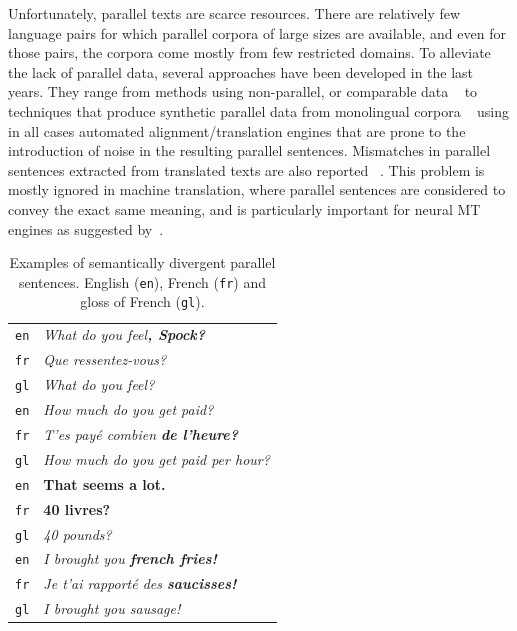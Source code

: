 \documentclass[11pt,a4paper]{article}
\begin{document}
Unfortunately, parallel texts are scarce resources. 
There are relatively few language pairs for which parallel corpora of large sizes are available, and even for those pairs, the corpora come mostly from few restricted domains. 
To alleviate the lack of parallel data, several approaches have been developed in the last years. 
They range from methods using non-parallel, or comparable data 
~\cite{Zhao:2002:APS:844380.844785,W04-3208,J05-4003,GregoireL18,P17-3003,P18-2037} to techniques that produce synthetic parallel data from monolingual corpora ~\cite{P16-1009,W17-4714} using in all cases automated alignment/translation engines that are prone to the introduction of noise in the resulting parallel sentences. 
Mismatches in parallel sentences extracted from translated texts are also reported ~\cite{tiedemann2011bitext,XU16.310}. 
This problem is mostly ignored in machine translation, where parallel sentences are considered to convey the exact same meaning, and is particularly important for neural MT engines as suggested by~\cite{chen2016adaptation}.

\begin{table}[ht]
\small
\center
\begin{tabular}{ c|l }
  \hline  
  \texttt{en} & \it{What do you feel}\bf{, Spock}\it{?} \\
  \texttt{fr} & \it{Que ressentez-vous?} \\
  \texttt{gl} & {\small \it{What do you feel?}} \\
  \hline
  \texttt{en} & \it{How much do you get paid?} \\
  \texttt{fr} & \it{T'es pay\'e combien} \bf{de l'heure}\it{?} \\
  \texttt{gl} & {\small \it{How much do you get paid per hour?}} \\
  \hline  
  \texttt{en} &  \bf{That seems a lot.} \\
  \texttt{fr} & \bf{40 livres?} \\
  \texttt{gl} & {\small \it{40 pounds?}} \\
  \hline  
  \texttt{en} & \it{I brought you} \bf{french fries}\it{!} \\
  \texttt{fr} & \it{Je t'ai rapport\'e des} \bf{saucisses}\it{!} \\
  \texttt{gl} & {\small \it{I brought you sausage!}} \\
  \hline
\end{tabular}
\caption[Table caption text]{Examples of semantically divergent parallel sentences. English (\texttt{en}), French (\texttt{fr}) and gloss of French (\texttt{gl}). }
\label{tab:examples}
\end{table}
\end{document}
